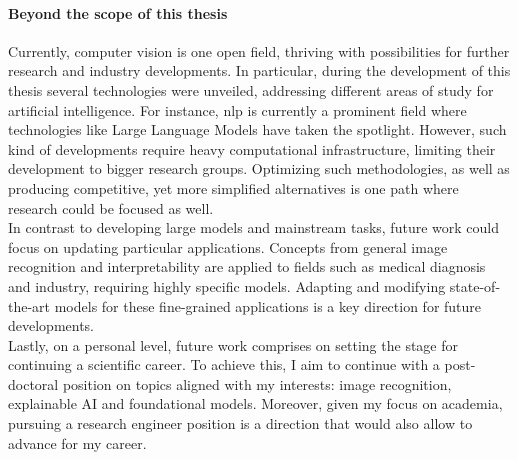 \paragraph{Beyond the scope of this thesis}
Currently, computer vision is one open field, thriving with possibilities for further research 
and industry developments. In particular, during the development of this thesis several 
technologies were unveiled, addressing different areas of study for artificial intelligence. 
For instance, \gls{nlp} is currently a prominent field where technologies like Large Language 
Models have taken the spotlight. However, such kind of developments require heavy computational 
infrastructure, limiting their development to bigger research groups. Optimizing such methodologies, 
as well as producing competitive, yet more simplified alternatives is one path where research 
could be focused as well.\\

\noindent In contrast to developing large models and mainstream tasks, future work could focus on 
updating particular applications. Concepts from general image recognition and interpretability are 
applied to fields such as medical diagnosis and industry, requiring highly specific models. 
Adapting and modifying state-of-the-art models for these fine-grained applications is a key 
direction for future developments.\\

\noindent Lastly, on a personal level, future work comprises on setting the stage for continuing a 
scientific career. To achieve this, I aim to continue with a post-doctoral position on topics 
aligned with my interests: image recognition, explainable AI and foundational models. Moreover, 
given my focus on academia, pursuing a research engineer position is a direction  that would 
also allow to advance for my career.